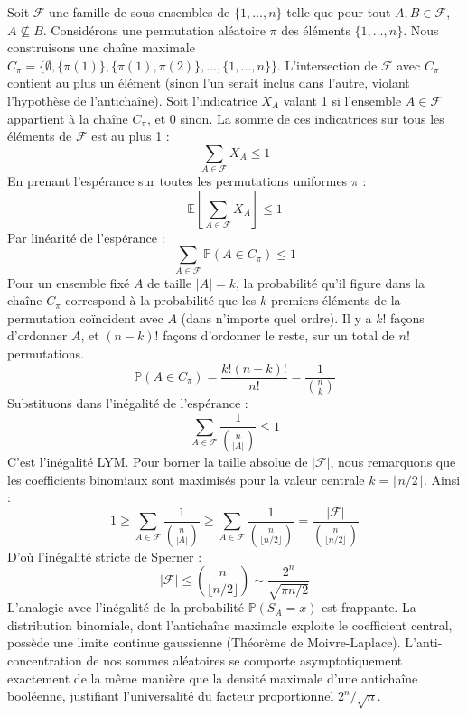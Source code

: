 \documentclass[12pt,a4paper]{article}
\begin{document}
Soit $\mathcal{F}$ une famille de sous-ensembles de $\{1, \dots, n\}$ telle que pour tout $A, B \in \mathcal{F}$, $A \not\subseteq B$.
Considérons une permutation aléatoire $\pi$ des éléments $\{1, \dots, n\}$.
Nous construisons une chaîne maximale $C_\pi = \{\emptyset, \{\pi(1)\}, \{\pi(1), \pi(2)\}, \dots, \{1, \dots, n\}\}$.
L'intersection de $\mathcal{F}$ avec $C_\pi$ contient au plus un élément (sinon l'un serait inclus dans l'autre, violant l'hypothèse de l'antichaîne).
Soit l'indicatrice $X_A$ valant 1 si l'ensemble $A \in \mathcal{F}$ appartient à la chaîne $C_\pi$, et 0 sinon.
La somme de ces indicatrices sur tous les éléments de $\mathcal{F}$ est au plus 1 :
$$ \sum_{A \in \mathcal{F}} X_A \le 1 $$
En prenant l'espérance sur toutes les permutations uniformes $\pi$ :
$$ \mathbb{E}\left[ \sum_{A \in \mathcal{F}} X_A \right] \le 1 $$
Par linéarité de l'espérance :
$$ \sum_{A \in \mathcal{F}} \mathbb{P}(A \in C_\pi) \le 1 $$
Pour un ensemble fixé $A$ de taille $|A| = k$, la probabilité qu'il figure dans la chaîne $C_\pi$ correspond à la probabilité que les $k$ premiers éléments de la permutation coïncident avec $A$ (dans n'importe quel ordre). Il y a $k!$ façons d'ordonner $A$, et $(n-k)!$ façons d'ordonner le reste, sur un total de $n!$ permutations.
$$ \mathbb{P}(A \in C_\pi) = \frac{k! (n-k)!}{n!} = \frac{1}{\binom{n}{k}} $$
Substituons dans l'inégalité de l'espérance :
$$ \sum_{A \in \mathcal{F}} \frac{1}{\binom{n}{|A|}} \le 1 $$
C'est l'inégalité LYM. Pour borner la taille absolue de $|\mathcal{F}|$, nous remarquons que les coefficients binomiaux sont maximisés pour la valeur centrale $k = \lfloor n/2 \rfloor$.
Ainsi :
$$ 1 \ge \sum_{A \in \mathcal{F}} \frac{1}{\binom{n}{|A|}} \ge \sum_{A \in \mathcal{F}} \frac{1}{\binom{n}{\lfloor n/2 \rfloor}} = \frac{|\mathcal{F}|}{\binom{n}{\lfloor n/2 \rfloor}} $$
D'où l'inégalité stricte de Sperner :
$$ |\mathcal{F}| \le \binom{n}{\lfloor n/2 \rfloor} \sim \frac{2^n}{\sqrt{\pi n / 2}} $$
L'analogie avec l'inégalité de la probabilité $\mathbb{P}(S_A = x)$ est frappante. La distribution binomiale, dont l'antichaîne maximale exploite le coefficient central, possède une limite continue gaussienne (Théorème de Moivre-Laplace). L'anti-concentration de nos sommes aléatoires se comporte asymptotiquement exactement de la même manière que la densité maximale d'une antichaîne booléenne, justifiant l'universalité du facteur proportionnel $2^n / \sqrt{n}$.

\newpage
\end{document}
